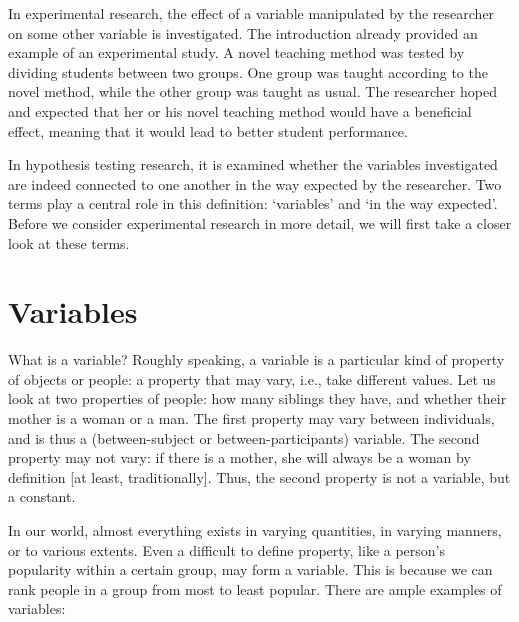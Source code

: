 \documentclass[
]{book}
\begin{document}
In experimental research, the effect of a variable manipulated by the researcher on some other variable is investigated. The introduction already provided an example of an experimental study. A novel teaching method was tested by dividing students between two groups. One group was taught according to the novel method, while the other group was taught as usual. The researcher hoped and expected that her or his novel teaching method would have a beneficial effect, meaning that it would lead to better student performance.

In hypothesis testing research, it is examined whether the variables investigated are indeed connected to one another in the way expected by the researcher. Two terms play a central role in this definition: `variables' and `in the way expected'. Before we consider experimental research in more detail, we will first take a closer look at these terms.

\hypertarget{sec:variables}{%
\section{Variables}\label{sec:variables}}

What is a variable? Roughly speaking, a variable is a particular kind of property of objects or people: a property that may vary, i.e., take different values. Let us look at two properties of people: how many siblings they have, and whether their mother is a woman or a man. The first property may vary between individuals, and is thus a (between-subject or between-participants) variable. The second property may not vary: if there is a mother, she will always be a woman by definition {[}at least, traditionally{]}. Thus, the second property is not a variable, but a constant.

In our world, almost everything exists in varying quantities, in varying manners, or to various extents. Even a difficult to define property, like a person's popularity within a certain group, may form a variable. This is because we can rank people in a group from most to least popular. There are ample examples of variables:
\end{document}
